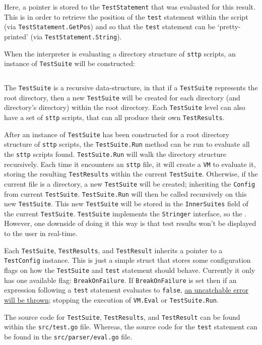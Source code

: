 Here, a pointer is stored to the \verb|TestStatement| that was evaluated for this result. This is in order to retrieve the position of the \verb|test| statement within the script (via \verb|TestStatement.GetPos|) and so that the \verb|test| statement can be `pretty-printed' (via \verb|TestStatement.String|).

When the interpreter is evaluating a directory structure of \verb|sttp| scripts, an instance of \verb|TestSuite| will be constructed:

\inputminted[firstline=76, lastline=86, autogobble, breaklines, tabsize=4]{go}{../../src/test.go}

The \verb|TestSuite| is a recursive data-structure, in that if a \verb|TestSuite| represents the root directory, then a new \verb|TestSuite| will be created for each directory (and directory's directory) within the root directory. Each \verb|TestSuite| level can also have a set of \verb|sttp| scripts, that can all produce their own \verb|TestResults|.

After an instance of \verb|TestSuite| has been constructed for a root directory structure of \verb|sttp| scripts, the \verb|TestSuite.Run| method can be run to evaluate all the \verb|sttp| scripts found. \verb|TestSuite.Run| will walk the directory structure recursively. Each time it encounters an \verb|sttp| file, it will create a \verb|VM| to evaluate it, storing the resulting \verb|TestResults| within the current \verb|TestSuite|. Otherwise, if the current file is a directory, a new \verb|TestSuite| will be created; inheriting the \verb|Config| from current \verb|TestSuite|. \verb|TestSuite.Run| will then be called recursively on this new \verb|TestSuite|. This new \verb|TestSuite| will be stored in the \verb|InnerSuites| field of the current \verb|TestSuite|. \verb|TestSuite| implements the \verb|Stringer| interface, so the . However, one downside of doing it this way is that test results won't be displayed to the user in real-time.

Each \verb|TestSuite|, \verb|TestResults|, and \verb|TestResult| inherits a pointer to a \verb|TestConfig| instance. This is just a simple struct that stores some configuration flags on how the \verb|TestSuite| and \verb|test| statement should behave. Currently it only has one available flag: \verb|BreakOnFailure|. If \verb|BreakOnFailure| is set then if an expression following a \verb|test| statement evaluates to \verb|false|, \hyperref[sec:development-try-catch-throw-errors-context]{an uncatchable error will be thrown}; stopping the execution of \verb|VM.Eval| or \verb|TestSuite.Run|.

The source code for \verb|TestSuite|, \verb|TestResults|, and \verb|TestResult| can be found within the \verb|src/test.go| file. Whereas, the source code for the \verb|test| statement can be found in the \verb|src/parser/eval.go| file.
